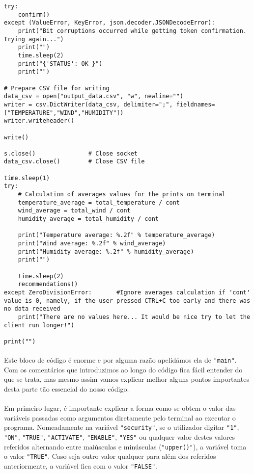 \documentclass[a4paper]{report}
\begin{document}
\begin{lstlisting}
try:
	confirm()
except (ValueError, KeyError, json.decoder.JSONDecodeError):
	print("Bit corruptions occurred while getting token confirmation. Trying again...")
	print("")
	time.sleep(2)
	print("{'STATUS': OK }")
	print("")
	
# Prepare CSV file for writing
data_csv = open("output_data.csv", "w", newline="")
writer = csv.DictWriter(data_csv, delimiter=";", fieldnames=["TEMPERATURE","WIND","HUMIDITY"])
writer.writeheader()

write()

s.close()				# Close socket
data_csv.close()		# Close CSV file

time.sleep(1)
try:
	# Calculation of averages values for the prints on terminal
	temperature_average = total_temperature / cont
	wind_average = total_wind / cont
	humidity_average = total_humidity / cont
	
	print("Temperature average: %.2f" % temperature_average)
	print("Wind average: %.2f" % wind_average)
	print("Humidity average: %.2f" % humidity_average)
	print("")
	
	time.sleep(2)
	recommendations()
except ZeroDivisionError:		#Ignore averages calculation if 'cont' value is 0, namely, if the user pressed CTRL+C too early and there was no data received
	print("There are no values here... It would be nice try to let the client run longer!")

print("")
\end{lstlisting}
\paragraph{}Este bloco de código é enorme e por alguma razão apelidámos ela de \texttt{"main"}. Com os comentários que introduzimos ao longo do código fica fácil entender do que se trata, mas mesmo assim vamos explicar melhor alguns pontos importantes desta parte tão essencial do nosso código.

\paragraph{}Em primeiro lugar, é importante explicar a forma como se obtem o valor das variáveis passadas como argumentos diretamente pelo terminal ao executar o programa. Nomeadamente na variável \texttt{"security"}, se o utilizador digitar \texttt{"1"}, \texttt{"ON"}, \texttt{"TRUE"}, \texttt{"ACTIVATE"}, \texttt{"ENABLE"}, \texttt{"YES"} ou qualquer valor destes valores referidos alternando entre maiúsculas e minúsculas (\texttt{"upper()"}), a variável toma o valor \texttt{"TRUE"}. Caso seja outro valor qualquer para além dos referidos anteriormente, a variável fica com o valor \texttt{"FALSE"}.
\end{document}
